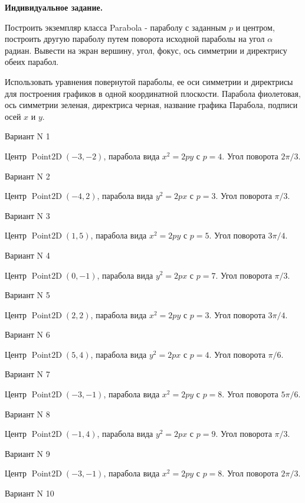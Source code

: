 \documentclass[11pt]{report}
\begin{document}
\pagestyle{empty}

{\bf Индивидуальное задание.}


Построить экземпляр класса Parabola - параболу с заданным $p$ и центром, построить другую параболу путем поворота исходной параболы  на угол $\alpha$ радиан. 
Вывести на экран вершину, угол, фокус, ось симметрии и директрису обеих парабол. 

Использовать уравнения повернутой параболы, ее оси симметрии и директрисы для построения графиков в одной координатной плоскости. 
Парабола фиолетовая, ось симметрии зеленая, директриса черная, название графика Парабола, подписи осей $x$ и $y$.

Вариант N 1

Центр $\operatorname{Point2D}\left(-3, -2\right)$, парабола вида $x^{2} = 2py$ с $p = 4$. Угол поворота $2 \pi / 3$.

Вариант N 2

Центр $\operatorname{Point2D}\left(-4, 2\right)$, парабола вида $y^{2} = 2px$ с $p = 3$. Угол поворота $\pi / 3$.

Вариант N 3

Центр $\operatorname{Point2D}\left(1, 5\right)$, парабола вида $x^{2} = 2py$ с $p = 5$. Угол поворота $3 \pi / 4$.

Вариант N 4

Центр $\operatorname{Point2D}\left(0, -1\right)$, парабола вида $y^{2} = 2px$ с $p = 7$. Угол поворота $\pi / 3$.

Вариант N 5

Центр $\operatorname{Point2D}\left(2, 2\right)$, парабола вида $x^{2} = 2py$ с $p = 3$. Угол поворота $3 \pi / 4$.

Вариант N 6

Центр $\operatorname{Point2D}\left(5, 4\right)$, парабола вида $y^{2} = 2px$ с $p = 4$. Угол поворота $\pi / 6$.

Вариант N 7

Центр $\operatorname{Point2D}\left(-3, -1\right)$, парабола вида $x^{2} = 2py$ с $p = 8$. Угол поворота $5 \pi / 6$.

Вариант N 8

Центр $\operatorname{Point2D}\left(-1, 4\right)$, парабола вида $y^{2} = 2px$ с $p = 9$. Угол поворота $\pi / 3$.

Вариант N 9

Центр $\operatorname{Point2D}\left(-3, -1\right)$, парабола вида $x^{2} = 2py$ с $p = 8$. Угол поворота $2 \pi / 3$.

Вариант N 10
\end{document}
